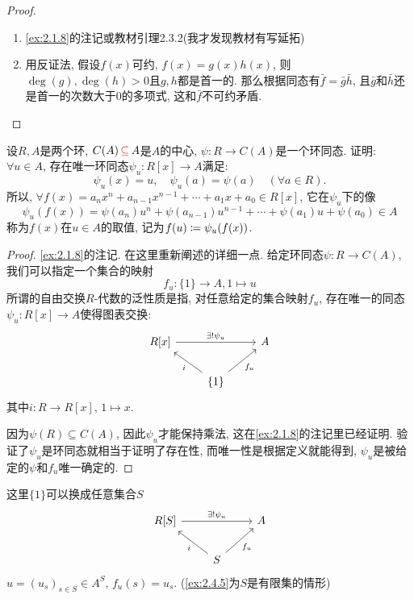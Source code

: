 \begin{proof}
    \begin{enumerate}[(1)]
        \item \ref{ex:2.1.8}的注记或教材引理2.3.2(我才发现教材有写延拓)
        \item 用反证法, 假设$f(x)$可约, $f(x) = g(x)h(x)$, 则$\deg(g), \deg(h) > 0$且$g, h$都是首一的. 那么根据同态有$\bar{f} = \bar{g}\bar{h}$, 且$\bar{g}$和$\bar{h}$还是首一的次数大于$0$的多项式, 这和$\bar{f}$不可约矛盾.
    \end{enumerate}
\end{proof}

\begin{problem}\label{ex:2.3.7}
    设$R, A$是两个环, $C(A) \,\textcolor{red}{\subseteq}\, A$是$A$的中心, $\psi:R \to C(A)$是一个环同态. 证明: $\forall u \in A$, 存在唯一环同态$\psi_u:R[x] \to A$满足:
    \[
        \psi_u(x) = u,\quad \psi_u(a) = \psi(a) \quad (\forall a \in R).
    \]
    所以, $\forall f(x) = a_nx^n + a_{n - 1}x^{n - 1} + \cdots + a_1x + a_0 \in R[x]$, 它在$\psi_u$下的像
    \[
        \psi_u(f(x)) = \psi(a_n)u^n + \psi(a_{n - 1})u^{n - 1} + \cdots + \psi(a_1)u + \psi(a_0) \in A
    \]
    称为$f(x)$在$u \in A$的取值, 记为$f(u) \mathrel{\coloneqq} \psi_u(f(x))$.
\end{problem}

\begin{proof}
    \ref{ex:2.1.8}的注记. 在这里重新阐述的详细一点. 给定环同态$\psi:R \to C(A)$, 我们可以指定一个集合的映射
    \[
        f_u:\{1\} \to A, 1 \mapsto u
    \]
    所谓的自由交换$R$-代数的泛性质是指, 对任意给定的集合映射$f_u$, 存在唯一的同态$\psi_u:R[x] \to A$使得图表交换:
    \[
        \begin{tikzcd}
            {R[x]} \arrow[rr, "\exists!\psi_u"] &                                          & A \\
                                                & \{1\} \arrow[lu, "i"] \arrow[ru, "f_u"'] &  
        \end{tikzcd}
    \]
    其中$i:R \to R[x],\, 1 \mapsto x$.

    因为$\psi(R) \subseteq C(A)$, 因此$\psi_u$才能保持乘法, 这在\ref{ex:2.1.8}的注记里已经证明. 验证了$\psi_u$是环同态就相当于证明了存在性, 而唯一性是根据定义就能得到, $\psi_u$是被给定的$\psi$和$f_u$唯一确定的.
\end{proof}

\begin{remark}
    这里$\{1\}$可以换成任意集合$S$
    \[
        \begin{tikzcd}
        {R[S]} \arrow[rr, "\exists!\psi_u"] &                                      & A \\
                                            & S \arrow[lu, "i"] \arrow[ru, "f_u"'] &  
        \end{tikzcd}
    \]
    $u = (u_s)_{s \in S} \in A^S,\, f_u(s) = u_s$. (\ref{ex:2.4.5}为$S$是有限集的情形)
\end{remark}

